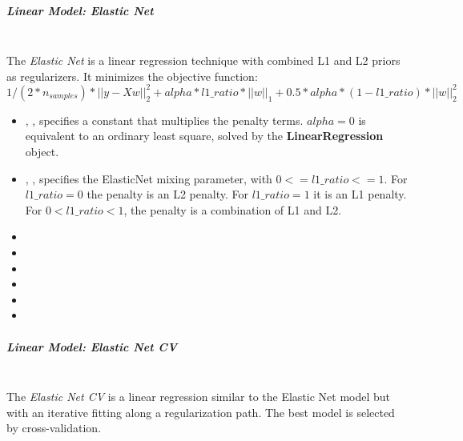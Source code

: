 \subparagraph{Linear Model: Elastic Net}
\mbox{}
\\The \textit{Elastic Net} is a linear regression technique with combined L1 and
L2 priors as regularizers.
%
It minimizes the objective function:
\begin{equation}
1/(2*n_{samples}) *||y - Xw||^2_2+alpha*l1\_ratio*||w||_1 + 0.5 *alpha*(1 - l1\_ratio)*||w||^2_2
\end{equation}

\begin{itemize}
  \item {}, , specifies a constant
  that multiplies the penalty terms.
  $alpha = 0$ is equivalent to an ordinary least square, solved by the
  \textbf{LinearRegression} object.
  \item {}, , specifies the
  ElasticNet mixing parameter, with $0 <= l1\_ratio <= 1$.
  For $l1\_ratio = 0$ the penalty is an L2 penalty.
  For $l1\_ratio = 1$ it is an L1 penalty.
  For $0 < l1\_ratio < 1$, the penalty is a combination of L1 and L2.
  \item {}
  \item {}
  \item {}
  \item {}
  \item {}
  \item {}
\end{itemize}
\subparagraph{Linear Model: Elastic Net CV}
\mbox{}
\\The \textit{Elastic Net CV} is a linear regression similar to the Elastic Net
model but with an iterative fitting along a regularization path.
%
The best model is selected by cross-validation.
%

